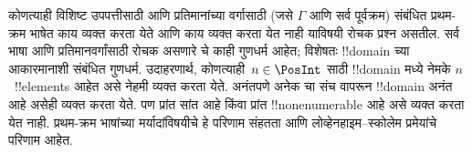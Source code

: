 \documentclass[../../../include/open-logic-section]{subfiles}
\begin{document}
कोणत्याही विशिष्ट उपपत्तीसाठी आणि प्रतिमानांच्या वर्गासाठी (जसे
$\Gamma$ आणि सर्व पूर्वक्रम) संबंधित प्रथम-क्रम भाषेत काय व्यक्त करता
येते आणि काय व्यक्त करता येत नाही याविषयी रोचक प्रश्न असतील. सर्व भाषा
आणि प्रतिमानवर्गांसाठी रोचक असणारे चे काही गुणधर्म आहेत;
विशेषतः !!{domain} च्या आकारमानाशी संबंधित गुणधर्म. उदाहरणार्थ,
कोणत्याही~$n \in \PosInt$ साठी !!{domain} मध्ये नेमके
$n$~!!{element}s आहेत असे नेहमी व्यक्त करता येते. अनंतपणे अनेक
चा संच वापरून !!{domain} अनंत आहे असेही व्यक्त करता येते.
पण प्रांत सांत आहे किंवा प्रांत !!{nonenumerable} आहे असे व्यक्त करता
येत नाही. प्रथम-क्रम भाषांच्या मर्यादांविषयीचे हे परिणाम संहतता आणि
लोव्हेनहाइम--स्कोलेम प्रमेयांचे परिणाम आहेत.
\end{document}
